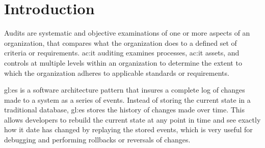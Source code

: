 %
\chapter{Introduction}





Audits are systematic and objective examinations of one or more aspects of an organization, that compares what the organization does to a defined set of criteria or requirements. \gls{ac:it} auditing examines processes, \gls{ac:it} assets, and controls at multiple levels within an organization to determine the extent to which the organization adheres to applicable standards or requirements. 

\gls{gl:es} is a software architecture pattern that insures a complete log of changes made to a system as a series of events. Instead of storing the current state in a traditional database, \gls{gl:es} stores the history of changes made over time. This allows developers to rebuild the current state at any point in time and see exactly how it date has changed by replaying the stored events, which is very useful for debugging and performing rollbacks or reversals of changes.

